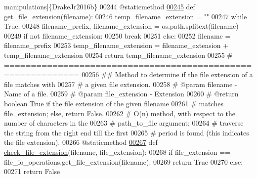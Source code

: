 \begin{DoxyCode}
{       manipulations]\{DrakeJr2016b\}}
00244     @staticmethod
\hypertarget{file__io_8py_source_l00245}{}\hyperlink{classutilities_1_1file__io_1_1file__io__operations_a7e3cbb46884ca64a14cd367b1e625082}{00245}     \textcolor{keyword}{def }\hyperlink{classutilities_1_1file__io_1_1file__io__operations_a7e3cbb46884ca64a14cd367b1e625082}{get\_file\_extension}(filename):
00246         temp\_filename\_extension = \textcolor{stringliteral}{""}
00247         \textcolor{keywordflow}{while} \textcolor{keyword}{True}:
00248             filename\_prefix, filename\_extension = os.path.splitext(filename)
00249             \textcolor{keywordflow}{if} \textcolor{keywordflow}{not} filename\_extension:
00250                 \textcolor{keywordflow}{break}
00251             \textcolor{keywordflow}{else}:
00252                 filename  = filename\_prefix
00253                 temp\_filename\_extension = filename\_extension + temp\_filename\_extension
00254         \textcolor{keywordflow}{return} temp\_filename\_extension
00255     \textcolor{comment}{# ============================================================}
00256     \textcolor{comment}{##  Method to determine if the file extension of a file matches with}
00257     \textcolor{comment}{#       a given file extension.}
00258     \textcolor{comment}{#   @param filename - Name of a file.}
00259     \textcolor{comment}{#   @param file\_extension - Extension}
00260     \textcolor{comment}{#   @return boolean True if the file extension of the given filename}
00261     \textcolor{comment}{#       matches file\_extension; else, return False.}
00262     \textcolor{comment}{#   O(n) method, with respect to the number of characters in the}
00263     \textcolor{comment}{#       path\_to\_file argument;}
00264     \textcolor{comment}{#       traverse the string from the right end till the first}
00265     \textcolor{comment}{#           period is found (this indicates the file extension).}
00266     @staticmethod
\hypertarget{file__io_8py_source_l00267}{}\hyperlink{classutilities_1_1file__io_1_1file__io__operations_a902e9fd0dc0da35e3b374deae44051c6}{00267}     \textcolor{keyword}{def }\hyperlink{classutilities_1_1file__io_1_1file__io__operations_a902e9fd0dc0da35e3b374deae44051c6}{check\_file\_extension}(filename, file\_extension):
00268         \textcolor{keywordflow}{if} file\_extension == file\_io\_operations.get\_file\_extension(filename):
00269             \textcolor{keywordflow}{return} \textcolor{keyword}{True}
00270         \textcolor{keywordflow}{else}:
00271             \textcolor{keywordflow}{return} \textcolor{keyword}{False}

\end{DoxyCode}

